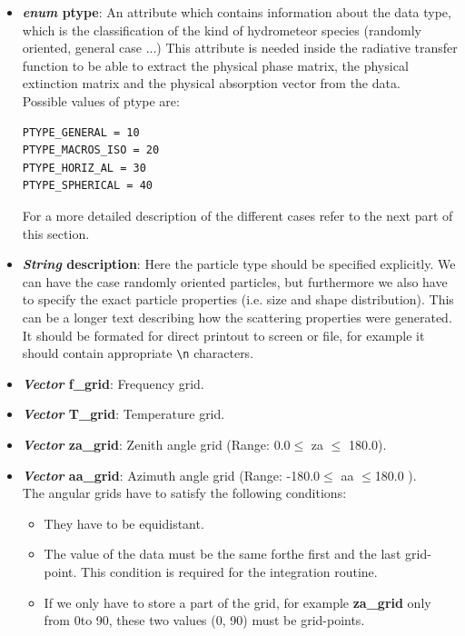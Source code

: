 \begin{itemize}
\item {\bf {\sl enum} ptype}: An attribute which contains information about
  the data type, which is the classification of the kind of hydrometeor species (randomly
  oriented, general case ...) This attribute is needed inside the
  radiative transfer function to be able to extract the physical phase
  matrix, the physical
  extinction matrix  and the physical absorption vector from the data.\\
  
  Possible values of ptype are:
\begin{verbatim}
PTYPE_GENERAL = 10
PTYPE_MACROS_ISO = 20
PTYPE_HORIZ_AL = 30
PTYPE_SPHERICAL = 40
\end{verbatim}
  
  For a more detailed description of the different cases refer to the
  next part of this section.
  
\item {\bf {\sl String} description}: Here the particle type should be
  specified explicitly. We can have the case randomly oriented
  particles, but furthermore we also have to specify the exact
  particle properties (i.e. size and shape distribution). This can be
  a longer text describing how the scattering properties were
  generated. It should be formated for direct printout to screen or
  file, for example it should contain appropriate {\verb "\n" }
  characters. 
    
\item {\bf {\sl Vector} f\_grid}: Frequency grid.

\item {\bf {\sl Vector} T\_grid}: Temperature grid. 

\item {\bf {\sl Vector} za\_grid}: Zenith angle grid (Range: 0.0\degree $\le$ za
  $\le$ 180.0\degree ).
  
  

\item {\bf {\sl Vector} aa\_grid}: Azimuth angle grid (Range: -180.0\degree $\le$ aa $\le$180.0 \degree).\\
  \vspace*{1ex} The angular grids have to satisfy the following
  conditions:
\begin{itemize}
\item They have to be equidistant.
\item The value of the data must be the same forthe first and the
  last grid-point. This condition is required for the integration
  routine.
\item If we only have to store a part of the grid, for example {\bf
    za\_grid} only from 0\degree to 90\degree, these two values (0\degree, 90\degree) must be
  grid-points.
\end{itemize}




\end{itemize}
